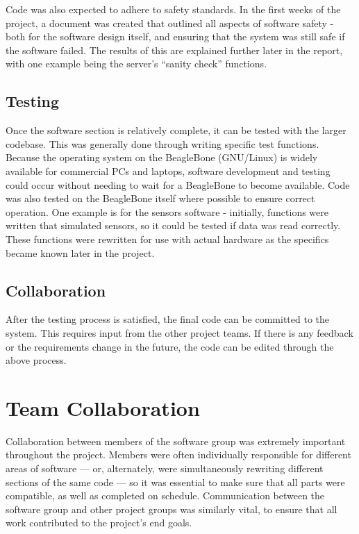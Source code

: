 Code was also expected to adhere to safety standards. In the first weeks of the project, a document\cite{kruger_safety} was created that outlined all aspects of software safety - both for the software design itself, and ensuring that the system was still safe if the software failed. The results of this are explained further later in the report, with one example being the server's ``sanity check'' functions.

\subsection{Testing}

Once the software section is relatively complete, it can be tested with the larger codebase. This was generally done through writing specific test functions. Because the operating system on the BeagleBone (GNU/Linux) is widely available for commercial PCs and laptops, software development and testing could occur without needing to wait for a BeagleBone to become available. Code was also tested on the BeagleBone itself where possible to ensure correct operation. One example is for the sensors software - initially, functions were written that simulated sensors, so it could be tested if data was read correctly. These functions were rewritten for use with actual hardware as the specifics became known later in the project.

\subsection{Collaboration}
After the testing process is satisfied, the final code can be committed to the system. This requires input from the other project teams. If there is any feedback or the requirements change in the future, the code can be edited through the above process.

\section{Team Collaboration}

Collaboration between members of the software group was extremely important throughout the project. Members were often individually responsible for different areas of software --- or, alternately, were simultaneously rewriting different sections of the same code --- so it was essential to make sure that all parts were compatible, as well as completed on schedule. Communication between the software group and other project groups was similarly vital, to ensure that all work contributed to the project’s end goals. 

